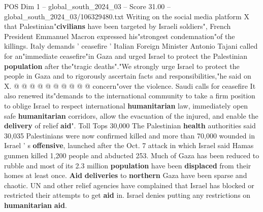 \begin{textsample}{POS Dim 1 – global\_south\_2024\_03 – Score 31.00 – global\_south\_2024\_03/106329480.txt}
Writing on the social media platform X that Palestinian"\textbf{civilians} have been targeted by Israeli soldiers", French President Emmanuel Macron expressed his"strongest condemnation"of the killings.
Italy demands ' ceasefire ' Italian Foreign Minister Antonio Tajani called for an"immediate ceasefire"in Gaza and urged Israel to protect the Palestinian \textbf{population} after the"tragic deaths"."We strongly urge Israel to protect the people in Gaza and to rigorously ascertain facts and responsibilities,"he said on X. @ @ @ @ @ @ @ @ @ @ concern"over the violence.
Saudi calls for ceasefire It also renewed its"demands to the international community to take a firm position to oblige Israel to respect international \textbf{humanitarian} law, immediately open safe \textbf{humanitarian} corridors, allow the evacuation of the injured, and enable the \textbf{delivery} of relief \textbf{aid}".
Toll Tops 30,000 The Palestinian \textbf{health} authorities said 30,035 Palestinians were now confirmed killed and more than 70,000 wounded in Israel ' s \textbf{offensive}, launched after the Oct. 7 attack in which Israel said Hamas gunmen killed 1,200 people and abducted 253.
Much of Gaza has been reduced to rubble and most of its 2.3 million \textbf{population} have been \textbf{displaced} from their homes at least once. \textbf{Aid} \textbf{deliveries} to \textbf{northern} Gaza have been sparse and chaotic.
UN and other relief agencies have complained that Israel has blocked or restricted their attempts to get \textbf{aid} in.
Israel denies putting any restrictions on \textbf{humanitarian} \textbf{aid}.

\end{textsample}
